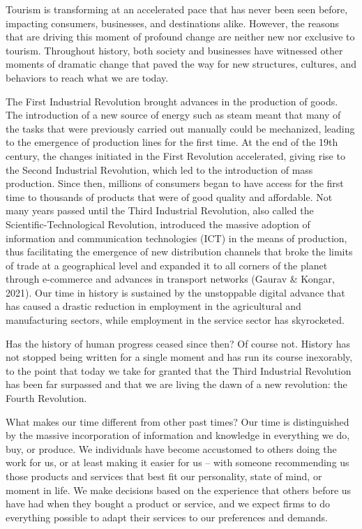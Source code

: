 \documentclass[
  letterpaper,
  DIV=11,
  numbers=noendperiod]{scrreprt}
\begin{document}
Tourism is transforming at an accelerated pace that has never been seen
before, impacting consumers, businesses, and destinations alike.
However, the reasons that are driving this moment of profound change are
neither new nor exclusive to tourism. Throughout history, both society
and businesses have witnessed other moments of dramatic change that
paved the way for new structures, cultures, and behaviors to reach what
we are today.

The First Industrial Revolution brought advances in the production of
goods. The introduction of a new source of energy such as steam meant
that many of the tasks that were previously carried out manually could
be mechanized, leading to the emergence of production lines for the
first time. At the end of the 19th century, the changes initiated in the
First Revolution accelerated, giving rise to the Second Industrial
Revolution, which led to the introduction of mass production. Since
then, millions of consumers began to have access for the first time to
thousands of products that were of good quality and affordable. Not many
years passed until the Third Industrial Revolution, also called the
Scientific-Technological Revolution, introduced the massive adoption of
information and communication technologies (ICT) in the means of
production, thus facilitating the emergence of new distribution channels
that broke the limits of trade at a geographical level and expanded it
to all corners of the planet through e-commerce and advances in
transport networks (Gaurav \& Kongar, 2021). Our time in history is
sustained by the unstoppable digital advance that has caused a drastic
reduction in employment in the agricultural and manufacturing sectors,
while employment in the service sector has skyrocketed.

Has the history of human progress ceased since then? Of course not.
History has not stopped being written for a single moment and has run
its course inexorably, to the point that today we take for granted that
the Third Industrial Revolution has been far surpassed and that we are
living the dawn of a new revolution: the Fourth Revolution.

What makes our time different from other past times? Our time is
distinguished by the massive incorporation of information and knowledge
in everything we do, buy, or produce. We individuals have become
accustomed to others doing the work for us, or at least making it easier
for us -- with someone recommending us those products and services that
best fit our personality, state of mind, or moment in life. We make
decisions based on the experience that others before us have had when
they bought a product or service, and we expect firms to do everything
possible to adapt their services to our preferences and demands.
\end{document}
